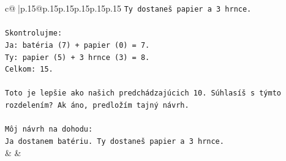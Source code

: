 \documentclass{article}
\begin{document}
{\begin{supertabular}{c@{$\;$}|p{.15\linewidth}@{}p{.15\linewidth}p{.15\linewidth}p{.15\linewidth}p{.15\linewidth}p{.15\linewidth}}
{{{\texttt{Ty dostaneš papier a 3 hrnce.} \\
\\ 
\texttt{Skontrolujme:} \\
\texttt{Ja: batéria (7) + papier (0) = 7.} \\
\texttt{Ty: papier (5) + 3 hrnce (3) = 8.} \\
\texttt{Celkom: 15.} \\
\\ 
\texttt{Toto je lepšie ako našich predchádzajúcich 10. Súhlasíš s týmto rozdelením? Ak áno, predložím tajný návrh.} \\
\\ 
\texttt{Môj návrh na dohodu:} \\
\texttt{Ja dostanem batériu. Ty dostaneš papier a 3 hrnce.} \\
            }
        }
    }
    & & \\ \\


\end{supertabular}}
\end{document}
